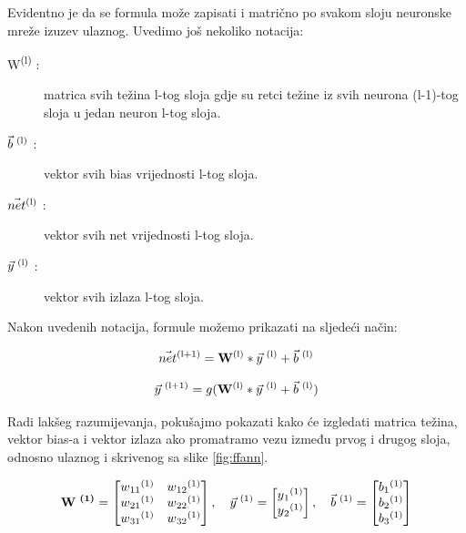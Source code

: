 \documentclass[times, utf8, zavrsni]{fer}
\begin{document}
Evidentno je da se formula može zapisati i matrično po svakom sloju neuronske mreže izuzev ulaznog. Uvedimo još nekoliko notacija:

\begin{description}
\item[W\textsuperscript{(l)} :] matrica svih težina l-tog sloja gdje su retci težine iz svih neurona (l-1)-tog sloja u jedan neuron l-tog sloja.
\item[$\Vec{b}\textsuperscript{ (l)}$ :] vektor svih bias vrijednosti l-tog sloja.
\item[$\Vec{net}\textsuperscript{(l)}$ :] vektor svih net vrijednosti l-tog sloja.
\item[$\Vec{y}\textsuperscript{ (l)}$ :] vektor svih izlaza l-tog sloja.
\end{description}

Nakon uvedenih notacija, formule možemo prikazati na sljedeći način:

\begin{equation}
    \label{eq:net-matrice}
    \text{$\Vec{net}\textsuperscript{(l+1)} = \textbf{W}\textsuperscript{(l)} * \Vec{y}\textsuperscript{ (l)} + \Vec{b}\textsuperscript{ (l)}$}
\end{equation}

\begin{equation}
    \label{eq:izlaz-matrice}
    \text{$\Vec{y}\textsuperscript{ (l+1)} = g(\textbf{W}\textsuperscript{(l)} * \Vec{y}\textsuperscript{ (l)} + \Vec{b}\textsuperscript{ (l)})$}
\end{equation}

Radi lakšeg razumijevanja, pokušajmo pokazati kako će izgledati matrica težina, vektor bias-a i vektor izlaza ako promatramo vezu između prvog i drugog sloja, odnosno ulaznog i skrivenog sa slike \ref{fig:ffann}.

\[
  \textbf{W\textsuperscript{ (1)}} =
  \begin{bmatrix}
    w\textsubscript{11}\textsuperscript{(1)} & w\textsubscript{12}\textsuperscript{(1)}\\
    w\textsubscript{21}\textsuperscript{(1)} & w\textsubscript{22}\textsuperscript{(1)}\\
    w\textsubscript{31}\textsuperscript{(1)} & w\textsubscript{32}\textsuperscript{(1)}
  \end{bmatrix},\quad
  \vec{y}\textsuperscript{ (1)} = 
  \begin{bmatrix}
   y\textsubscript{1}\textsuperscript{(1)} \\
   y\textsubscript{2}\textsuperscript{(1)}
  \end{bmatrix},\quad
  \vec{b}\textsuperscript{ (1)} = 
  \begin{bmatrix}
    b\textsubscript{1}\textsuperscript{(1)} \\
    b\textsubscript{2}\textsuperscript{(1)} \\
    b\textsubscript{3}\textsuperscript{(1)}
  \end{bmatrix}
\]
\end{document}
